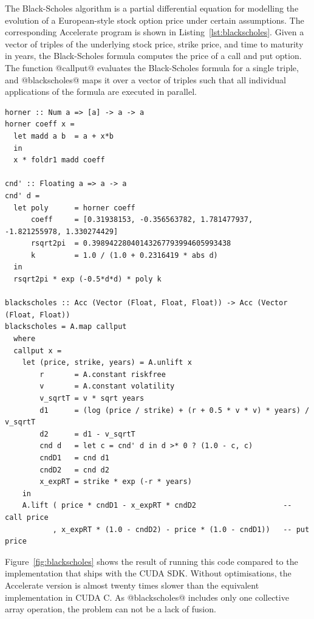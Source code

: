 The Black-Scholes algorithm is a partial differential equation for modelling the
evolution of a European-style stock option price under certain assumptions. The
corresponding Accelerate program is shown in Listing~\ref{lst:blackscholes}.
Given a vector of triples of the underlying stock price, strike price, and time
to maturity in years, the Black-Scholes formula computes the price of a call and
put option. The function @callput@ evaluates the Black-Scholes formula for
a single triple, and @blackscholes@ maps it over a vector of triples such
that all individual applications of the formula are executed in parallel.
%
\begin{lstlisting}[style=haskell
    ,float
    ,label=lst:blackscholes
    ,caption={Black-Scholes option pricing in Accelerate}]
horner :: Num a => [a] -> a -> a
horner coeff x =
  let madd a b  = a + x*b
  in
  x * foldr1 madd coeff

cnd' :: Floating a => a -> a
cnd' d =
  let poly      = horner coeff
      coeff     = [0.31938153, -0.356563782, 1.781477937, -1.821255978, 1.330274429]
      rsqrt2pi  = 0.39894228040143267793994605993438
      k         = 1.0 / (1.0 + 0.2316419 * abs d)
  in
  rsqrt2pi * exp (-0.5*d*d) * poly k

blackscholes :: Acc (Vector (Float, Float, Float)) -> Acc (Vector (Float, Float))
blackscholes = A.map callput
  where
  callput x =
    let (price, strike, years) = A.unlift x
        r       = A.constant riskfree
        v       = A.constant volatility
        v_sqrtT = v * sqrt years
        d1      = (log (price / strike) + (r + 0.5 * v * v) * years) / v_sqrtT
        d2      = d1 - v_sqrtT
        cnd d   = let c = cnd' d in d >* 0 ? (1.0 - c, c)
        cndD1   = cnd d1
        cndD2   = cnd d2
        x_expRT = strike * exp (-r * years)
    in
    A.lift ( price * cndD1 - x_expRT * cndD2                    -- call price
           , x_expRT * (1.0 - cndD2) - price * (1.0 - cndD1))   -- put price
\end{lstlisting}

Figure~\ref{fig:blackscholes} shows the result of running this code compared to
the implementation that ships with the CUDA SDK. Without optimisations, the
Accelerate version is almost twenty times slower than the equivalent
implementation in CUDA C. As @blackscholes@ includes only one collective
array operation, the problem can not be a lack of fusion.

